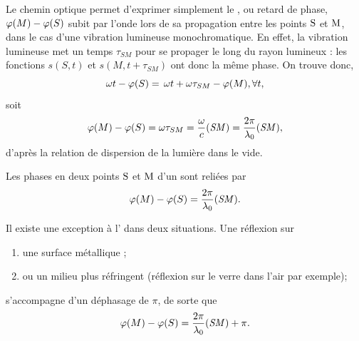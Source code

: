 \documentclass[12pt,fancy]{cours}
\begin{document}

 Le chemin optique permet d'exprimer simplement le , ou retard de phase, $\varphi(M) - \varphi(S)$ subit par l'onde lors de sa propagation entre les points $\rm S$ et $\rm M$, dans le cas d'une vibration lumineuse monochromatique. En effet, la vibration lumineuse met un temps $\tau_{SM}$ pour se propager le long du rayon lumineux :
les fonctions $
s(S,t)$ et $s(M,t+\tau_{SM})$ ont donc la même phase. On trouve donc,
\begin{equation}
  \omega t - \varphi(S) =\,\omega t + \omega \tau_{SM} - \varphi(M), \forall t,
\end{equation}
soit
    \begin{equation}
    \label{eq:dephasage_source_point_M}
    \varphi(M)-\varphi(S) = \omega \tau_{SM} = \frac{\omega}{c}\mathit{(SM)}=\frac{2\pi}{\lambda_0}\mathit{(SM)},
    \end{equation}
d'après la relation de dispersion de la lumière dans le vide.
    \begin{theorem}\label{form:}
      Les phases en deux points $\rm S$ et $\rm M$ d'un  sont reliées par
      $$
      \varphi(M) - \varphi(S) =  \frac{2\pi}{\lambda_0}\mathit{(SM)}.
      $$
    \end{theorem}

\begin{remarque}
Il existe une exception à l' dans deux situations. Une réflexion sur
\begin{enumerate}
  \item une surface métallique ;
  \item ou un milieu plus réfringent (réflexion sur le verre dans l'air par exemple);
\end{enumerate}
s'accompagne d'un déphasage de $\pi$, de sorte que
   \begin{equation}
   \varphi(M)-\varphi(S)=\frac{2\pi}{\lambda_0}\mathit{(SM)}+\pi.
   \end{equation}
\end{remarque}
\end{document}
